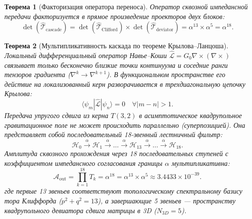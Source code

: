 \documentclass[11pt,a4paper]{article}
\newtheorem{theorem}{Теорема}
\theoremstyle{definition}
\theoremstyle{remark}
\begin{document}
\begin{theorem}[Факторизация оператора переноса]
\label{thm:transfer_operator_factorization}
Оператор сквозной импедансной передачи факторизуется в прямое произведение проекторов двух блоков:
\begin{equation}
	\det(\hat{\mathcal{T}}_{\mathrm{cascade}}) = \det(\hat{\mathcal{T}}_{\mathrm{Clifford}}) \times \det(\hat{\mathcal{T}}_{\mathrm{deviator}}) = \alpha^{13} \times \alpha^5 = \alpha^{18}.
	\label{eq:two_block_factorization_exact}
\end{equation}
\end{theorem}

\begin{theorem}[Мультипликативность каскада по теореме Крылова--Ланцоша]
\label{thm:lanczos_cascade_multiplicative}
Локальный дифференциальный оператор Навье--Коши $\hat{\mathcal{L}} = G_0 \nabla \times (\nabla \times)$ связывает только бесконечно близкие точки континуума и соседние ранги тензоров градиента ($\nabla^k \to \nabla^{k+1}$). В функциональном пространстве его действие на локализованный керн разворачивается в трехдиагональную цепочку Крылова:
\begin{equation}
    \langle \psi_m | \hat{\mathcal{L}} | \psi_n \rangle = 0 \quad \forall |m - n| > 1.
    \label{eq:tridiagonal_krylov_chain}
\end{equation}
Передача упругого сдвига из керна $T(3,2)$ в асимптотическое квадрупольное гравитационное поле не может происходить параллельно (суперпозицией). Она представляет собой последовательный 18-звенный лестничный фильтр:
\begin{equation}
    \mathcal{H}_0 \xrightarrow{\alpha} \mathcal{H}_1 \xrightarrow{\alpha} \dots \xrightarrow{\alpha} \mathcal{H}_{13} \xrightarrow{\alpha} \dots \xrightarrow{\alpha} \mathcal{H}_{18}.
\end{equation}
Амплитуда сквозного прохождения через 18 последовательных ступеней с коэффициентом импедансного согласования границы $\alpha$ мультипликативна:
\begin{equation}
    \mathcal{A}_{\mathrm{out}} = \prod_{k=1}^{18} T_k = \alpha^{18} = \alpha^{13} \times \alpha^5 \approx 3.4433 \times 10^{-39}.
    \label{eq:lanczos_multiplicative_alpha18}
\end{equation}
где первые 13 звеньев соответствуют топологическому спектральному базису тора Клиффорда ($p^2+q^2 = 13$), а завершающие 5 звеньев --- пространству квадрупольного девиатора сдвига матрицы в 3D ($N_{3D} = 5$).
\end{theorem}
\end{document}
